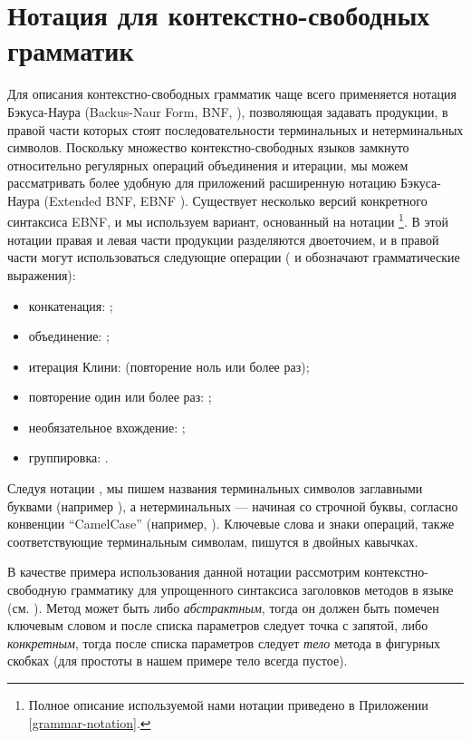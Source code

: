 \section{Нотация для контекстно-свободных грамматик}

Для описания контекстно-свободных грамматик чаще всего применяется нотация Бэкуса-Наура (Backus-Naur Form, BNF, \cite{BNF}), позволяющая задавать продукции, в правой части которых стоят последовательности терминальных и нетерминальных символов. Поскольку множество контекстно-свободных языков замкнуто относительно регулярных операций объединения и итерации, мы можем рассматривать более удобную для приложений расширенную нотацию Бэкуса-Наура (Extended BNF, EBNF \cite{EBNF}). Существует несколько версий конкретного синтаксиса EBNF, и мы используем вариант, основанный на нотации  \cite{ANTLR}\footnote{Полное описание используемой нами нотации приведено в Приложении \ref{grammar-notation}.}. В этой нотации правая и левая части продукции разделяются двоеточием, и в правой части могут использоваться следующие операции ( и  обозначают грамматические выражения):
\begin{itemize}
\item конкатенация: ;
\item объединение: ;
\item итерация Клини:  (повторение ноль или более раз);
\item повторение один или более раз: ;
\item необязательное вхождение: ;
\item группировка: .
\end{itemize}
Следуя нотации , мы пишем названия терминальных символов заглавными буквами (например ), а нетерминальных --- начиная со строчной буквы, согласно конвенции ``CamelCase'' (например, ). Ключевые слова и знаки операций, также соответствующие терминальным символам, пишутся в двойных кавычках.

В качестве примера использования данной нотации рассмотрим контекстно-свободную грамматику для упрощенного синтаксиса заголовков методов в языке  \cite{JLS} (см. ). Метод может быть либо \emph{абстрактным}, тогда он должен быть помечен ключевым словом  и после списка параметров следует точка с запятой, либо \emph{конкретным}, тогда после списка параметров следует \emph{тело} метода в фигурных скобках (для простоты в нашем примере тело всегда пустое). 

